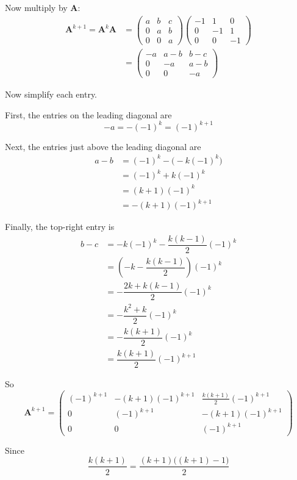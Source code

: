 \documentclass[leqno]{article}
\begin{document}
\begin{enumerate}[
  label=\textbf{\arabic*.},
  leftmargin=*,
  topsep=0pt,
  partopsep=0pt,
  parsep=0pt
]
\begin{djsSolution}
Now multiply by \(\mathbf{A}\):
\begin{align*}
\mathbf{A}^{k+1}=\mathbf{A}^{k}\mathbf{A}
&=
\begin{pmatrix}
a & b & c\\
0 & a & b\\
0 & 0 & a
\end{pmatrix}
\begin{pmatrix}
-1 & 1 & 0\\
0 & -1 & 1\\
0 & 0 & -1
\end{pmatrix}\\
&=
\begin{pmatrix}
-a & a-b & b-c\\
0 & -a & a-b\\
0 & 0 & -a
\end{pmatrix}
\end{align*}

Now simplify each entry.

First, the entries on the leading diagonal are
\[
-a=-(-1)^{k}=(-1)^{k+1}
\]

Next, the entries just above the leading diagonal are
\begin{align*}
a-b
&= (-1)^{k}-\bigl(-k(-1)^{k}\bigr)\\
&= (-1)^{k}+k(-1)^{k}\\
&= (k+1)(-1)^{k}\\
&= -(k+1)(-1)^{k+1}
\end{align*}

Finally, the top-right entry is
\begin{align*}
b-c
&= -k(-1)^{k}-\dfrac{k(k-1)}{2}(-1)^{k}\\
&= \left(-k-\dfrac{k(k-1)}{2}\right)(-1)^{k}\\
&= -\dfrac{2k+k(k-1)}{2}(-1)^{k}\\
&= -\dfrac{k^{2}+k}{2}(-1)^{k}\\
&= -\dfrac{k(k+1)}{2}(-1)^{k}\\
&= \dfrac{k(k+1)}{2}(-1)^{k+1}
\end{align*}

So
\[
\mathbf{A}^{k+1}
=
\begin{pmatrix}
(-1)^{k+1} & -(k+1)(-1)^{k+1} & \frac{k(k+1)}{2}(-1)^{k+1}\\
0 & (-1)^{k+1} & -(k+1)(-1)^{k+1}\\
0 & 0 & (-1)^{k+1}
\end{pmatrix}
\]

Since
\[
\dfrac{k(k+1)}{2}=\dfrac{(k+1)\bigl((k+1)-1\bigr)}{2}
\]


\end{djsSolution}
\end{enumerate}
\end{document}

